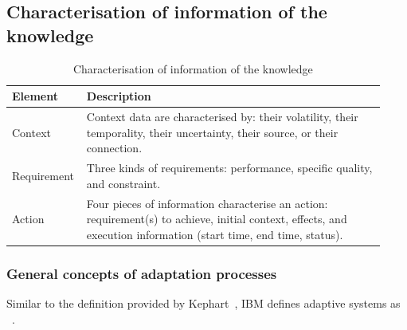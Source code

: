 %

\subsection{Characterisation of information of the knowledge}

\begin{table}
		\centering
    	\begin{tabular}{p{0.15\linewidth}p{0.78\linewidth}}
    		\hline
    		\textbf{Element} & \textbf{Description} \\
    		\hline
    		Context & Context data are characterised by: their volatility, their temporality, their uncertainty, their source, or their connection.\\
    		Requirement & Three kinds of requirements: performance, specific quality, and constraint. \\
    		Action & Four pieces of information characterise an action: requirement(s) to achieve, initial context, effects, and execution information (start time, end time, status).\\
    		\hline
    	\end{tabular}
    	\caption{Characterisation of information of the knowledge}
    	\label{table:background:adptSyst:charc}
\end{table}


\subsubsection{General concepts of adaptation processes}

Similar to the definition provided by Kephart~\cite{DBLP:journals/computer/KephartC03}, IBM  defines adaptive systems as ~\cite{computing2006architectural}.

